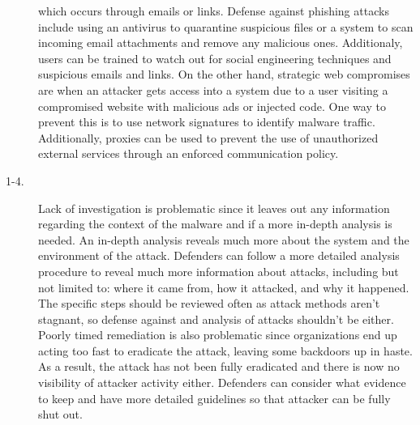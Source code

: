 \documentclass[11pt]{article}
\begin{document}
\begin{description}
    which occurs through emails or links. Defense against phishing attacks include using an antivirus to quarantine suspicious
    files or a system to scan incoming email attachments and remove any malicious ones. Additionaly, users can be trained to
    watch out for social engineering techniques and suspicious emails and links. On the other hand, strategic web compromises
    are when an attacker gets access into a system due to a user visiting a compromised website with malicious ads or injected
    code. One way to prevent this is to use network signatures to identify malware traffic. Additionally, proxies can be used
    to prevent the use of unauthorized external services through an enforced communication policy.
  \item[1-4.] Lack of investigation is problematic since it leaves out any information regarding the context of the malware
    and if a more in-depth analysis is needed. An in-depth analysis reveals much more about the system and the environment of
    the attack. Defenders can follow a more detailed analysis procedure to reveal much more information about attacks, including
    but not limited to: where it came from, how it attacked, and why it happened. The specific steps should be reviewed often
    as attack methods aren't stagnant, so defense against and analysis of attacks shouldn't be either. Poorly timed remediation
    is also problematic since organizations end up acting too fast to eradicate the attack, leaving some backdoors up in haste.
    As a result, the attack has not been fully eradicated and there is now no visibility of attacker activity either. Defenders
    can consider what evidence to keep and have more detailed guidelines so that attacker can be fully shut out.
\end{description}
\end{document}
